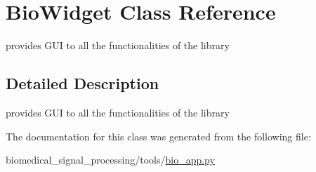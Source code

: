 \hypertarget{classBioWidget}{}\section{Bio\+Widget Class Reference}
\label{classBioWidget}


provides G\+UI to all the functionalities of the library  




\subsection{Detailed Description}
provides G\+UI to all the functionalities of the library 

The documentation for this class was generated from the following file\+:\begin{DoxyCompactItemize}
\item 
biomedical\+\_\+signal\+\_\+processing/tools/\hyperlink{bio__app_8py}{bio\+\_\+app.\+py}\end{DoxyCompactItemize}

